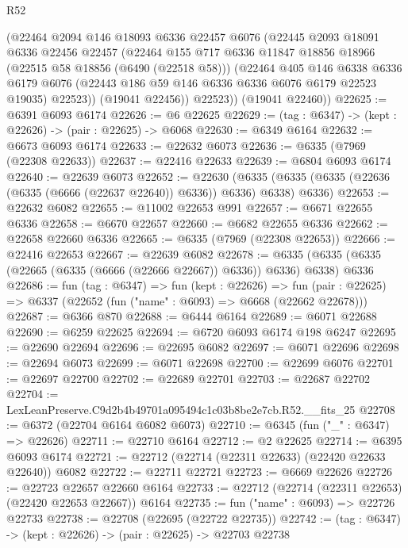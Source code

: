 \begin{lexlean}{R52}
\begin{coremodule}
        (@22464
          @2094
          @146
          @18093
          @6336
          @22457
          @6076
          (@22445
            @2093
            @18091
            @6336
            @22456
            @22457
            (@22464
              @155
              @717
              @6336
              @11847
              @18856
              @18966
              (@22515 @58 @18856 (@6490 (@22518 @58)))
              (@22464
                @405
                @146
                @6338
                @6336
                @6179
                @6076
                (@22443 @186 @59 @146 @6336 @6336 @6076 @6179 @22523 @19035)
                @22523))
            (@19041 @22456))
          @22523))
      (@19041 @22460))
@22625 := @6391 @6093 @6174
@22626 := @6 @22625
@22629 := (tag : @6347) -> (kept : @22626) -> (pair : @22625) -> @6068
@22630 := @6349 @6164
@22632 := @6673 @6093 @6174
@22633 := @22632 @6073
@22636 := @6335 (@7969 (@22308 @22633))
@22637 := @22416 @22633
@22639 := @6804 @6093 @6174
@22640 := @22639 @6073
@22652 := @22630
    (@6335 (@6335 (@6335 (@22636 (@6335 (@6666 (@22637 @22640)) @6336)) @6336) @6338) @6336)
@22653 := @22632 @6082
@22655 := @11002 @22653 @991
@22657 := @6671 @22655 @6336
@22658 := @6670 @22657
@22660 := @6682 @22655 @6336
@22662 := @22658 @22660 @6336
@22665 := @6335 (@7969 (@22308 @22653))
@22666 := @22416 @22653
@22667 := @22639 @6082
@22678 := @6335 (@6335 (@6335 (@22665 (@6335 (@6666 (@22666 @22667)) @6336)) @6336) @6338) @6336
@22686 := fun (tag : @6347) =>
  fun (kept : @22626) =>
  fun (pair : @22625) => @6337 (@22652 (fun ("name" : @6093) => @6668 (@22662 @22678)))
@22687 := @6366 @870
@22688 := @6444 @6164
@22689 := @6071 @22688
@22690 := @6259 @22625
@22694 := @6720 @6093 @6174 @198 @6247
@22695 := @22690 @22694
@22696 := @22695 @6082
@22697 := @6071 @22696
@22698 := @22694 @6073
@22699 := @6071 @22698
@22700 := @22699 @6076
@22701 := @22697 @22700
@22702 := @22689 @22701
@22703 := @22687 @22702
@22704 := LexLeanPreserve.C9d2b4b49701a095494c1c03b8be2e7cb.R52.__fits_25
@22708 := @6372 (@22704 @6164 @6082 @6073)
@22710 := @6345 (fun ("_" : @6347) => @22626)
@22711 := @22710 @6164
@22712 := @2 @22625
@22714 := @6395 @6093 @6174
@22721 := @22712 (@22714 (@22311 @22633) (@22420 @22633 @22640)) @6082
@22722 := @22711 @22721
@22723 := @6669 @22626
@22726 := @22723 @22657 @22660 @6164
@22733 := @22712 (@22714 (@22311 @22653) (@22420 @22653 @22667)) @6164
@22735 := fun ("name" : @6093) => @22726 @22733
@22738 := @22708 (@22695 (@22722 @22735))
@22742 := (tag : @6347) -> (kept : @22626) -> (pair : @22625) -> @22703 @22738

\end{coremodule}
\end{lexlean}
